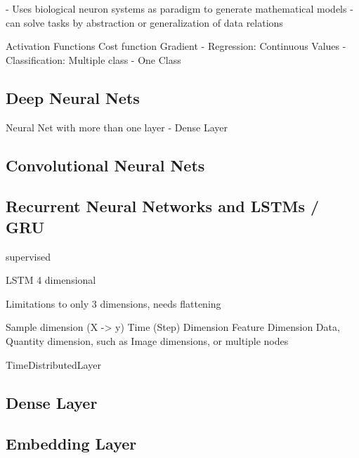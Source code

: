 - Uses biological neuron systems as paradigm to generate mathematical models
- can solve tasks by abstraction or generalization of data relations


Activation Functions
Cost function
Gradient
- Regression: Continuous Values
- Classification: Multiple class
- One Class

\subsection{Deep Neural Nets}

Neural Net with more than one layer
- Dense Layer

\subsection{Convolutional Neural Nets}
\subsection{Recurrent Neural Networks and LSTMs / GRU}
supervised

LSTM 4 dimensional

Limitations to only 3 dimensions, needs flattening

Sample dimension (X -> y)
Time (Step) Dimension
Feature Dimension
Data, Quantity dimension, such as Image dimensions, or multiple nodes

TimeDistributedLayer

\subsection{Dense Layer}
\label{subsec:dense-layer}

\subsection{Embedding Layer}
\label{subsec:embedding-layer}

